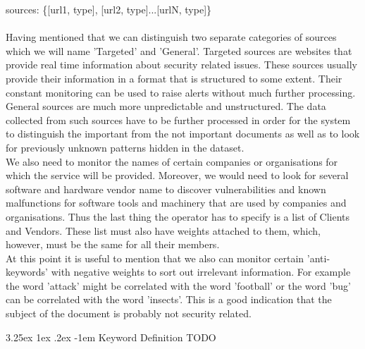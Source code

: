 \documentclass[12pt]{article}
\makeatletter
\renewcommand\paragraph{\@startsection{paragraph}{5}{\z@}%
  {3.25ex \@plus1ex \@minus.2ex}%
  {-1em}%
  {\normalfont\normalsize\bfseries}}
\makeatother
\begin{document}
sources: \{[url1, type], [url2, type]...[urlN, type]\}\\\\
Having mentioned that we can distinguish two separate categories of sources which we will name 'Targeted' and 'General'. Targeted sources are websites that provide real time information about security related issues. These sources usually provide their information in a format that is structured to some extent. Their constant monitoring can be used to raise alerts without much further processing.
\hfill \break \\
General sources are much more unpredictable and unstructured. The data collected from such sources have to be further processed in order for the system to distinguish the important from the not important documents as well as to look for previously unknown patterns hidden in the dataset. 
\hfill \break \\
We also need to monitor the names of certain companies or organisations for which the service will be provided. Moreover, we would need to look for several software and hardware vendor name to discover vulnerabilities and known malfunctions for software tools and machinery that are used by companies and organisations. Thus the last thing the operator has to specify is a list of Clients and Vendors. These list must also have weights attached to them, which, however, must be the same for all their members. 
\hfill \break \\
At this point it is useful to mention that we also can monitor certain 'anti-keywords' with negative weights to sort out irrelevant information. For example the word 'attack' might be correlated with the word 'football' or the word 'bug' can be correlated with the word 'insects'. This is a good indication that the subject of the document is probably not security related. 

\paragraph{Keyword Definition}
TODO
\end{document}

